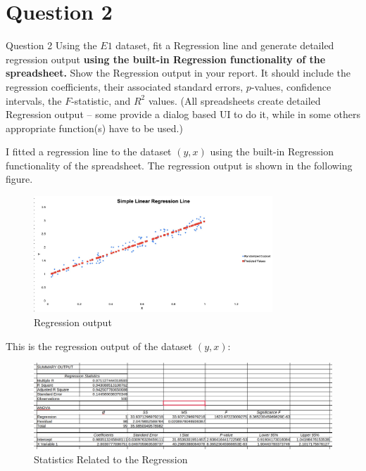 \section*{Question 2}

\begin{custombox}[label={box:Q2}]{Question 2}
	Using the $E1$ dataset, fit a Regression line and generate detailed regression output \textbf{using the built-in Regression functionality of the spreadsheet.} Show the Regression output in your report. It should include the regression coefficients, their associated standard errors, $p$-values, confidence intervals, the $F$-statistic, and $R^2$ values. (All spreadsheets create detailed Regression output – some provide a dialog based UI to do it, while in some others appropriate function(s) have to be used.)
\end{custombox}

I fitted a regression line to the dataset $(y, x)$ using the built-in Regression functionality of the spreadsheet. The regression output is shown in the following figure.

\begin{figure}[H]
	\centering
	\includegraphics[width=0.8\textwidth]{Images/Q1_2.jpeg}
	\caption{Regression output}
	\label{fig:Q2}
\end{figure}

This is the regression output of the dataset $(y, x)$:

\begin{figure}[H]
	\centering
	\includegraphics[width=\textwidth]{Images/Q2_1.png}
	\caption{Statistics Related to the Regression}
	\label{fig:Q2_1}
\end{figure}

